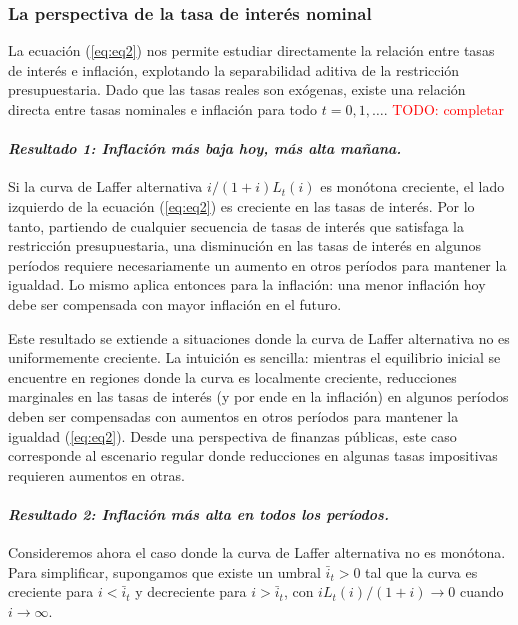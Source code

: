 \documentclass[../../entrega.tex]{subfiles}
\begin{document}
\subsubsection{La perspectiva de la tasa de interés nominal}
La ecuación (\ref{eq:eq2}) nos permite estudiar directamente la relación entre tasas de interés e inflación, explotando la separabilidad aditiva de la restricción presupuestaria.
Dado que las tasas reales son exógenas, existe una relación directa entre tasas nominales e inflación para todo $t = 0, 1, \ldots$.
\textcolor{red}{TODO: completar}

\paragraph[Resultado 1]{\emph{Resultado 1: Inflación más baja hoy, más alta mañana.}}\label{par:result1}
Si la curva de Laffer alternativa $i/(1 + i)L_t(i)$ es monótona creciente, el lado izquierdo de la ecuación (\ref{eq:eq2}) es creciente en las tasas de interés.
Por lo tanto, partiendo de cualquier secuencia de tasas de interés que satisfaga la restricción presupuestaria, una disminución en las tasas de interés en algunos períodos requiere necesariamente un aumento en otros períodos para mantener la igualdad.
Lo mismo aplica entonces para la inflación: una menor inflación hoy debe ser compensada con mayor inflación en el futuro.

Este resultado se extiende a situaciones donde la curva de Laffer alternativa no es uniformemente creciente.
La intuición es sencilla: mientras el equilibrio inicial se encuentre en regiones donde la curva es localmente creciente, reducciones marginales en las tasas de interés (y por ende en la inflación) en algunos períodos deben ser compensadas con aumentos en otros períodos para mantener la igualdad (\ref{eq:eq2}).
Desde una perspectiva de finanzas públicas, este caso corresponde al escenario regular donde reducciones en algunas tasas impositivas requieren aumentos en otras.

\paragraph[Resultado 2]{\emph{Resultado 2: Inflación más alta en todos los períodos.}}
Consideremos ahora el caso donde la curva de Laffer alternativa no es monótona.
Para simplificar, supongamos que existe un umbral $\bar{i}_t > 0$ tal que la curva es creciente para $i < \bar{i}_t$ y decreciente para $i > \bar{i}_t$, con $iL_t(i)/(1 + i) \to 0$ cuando $i \to \infty$.
\end{document}
